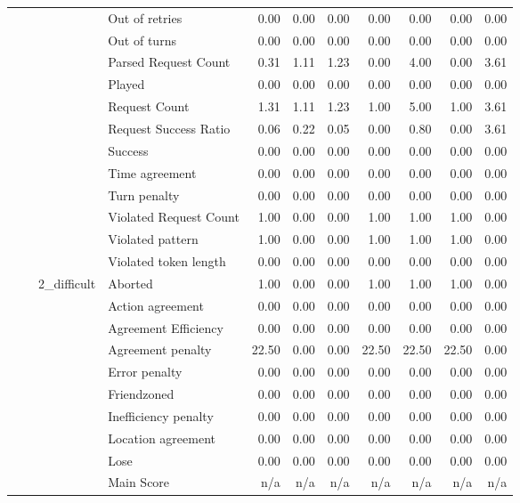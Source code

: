 \begin{tabular}{llllrrrrrrr}
 &  &  & Out of retries & 0.00 & 0.00 & 0.00 & 0.00 & 0.00 & 0.00 & 0.00 \\
 &  &  & Out of turns & 0.00 & 0.00 & 0.00 & 0.00 & 0.00 & 0.00 & 0.00 \\
 &  &  & Parsed Request Count & 0.31 & 1.11 & 1.23 & 0.00 & 4.00 & 0.00 & 3.61 \\
 &  &  & Played & 0.00 & 0.00 & 0.00 & 0.00 & 0.00 & 0.00 & 0.00 \\
 &  &  & Request Count & 1.31 & 1.11 & 1.23 & 1.00 & 5.00 & 1.00 & 3.61 \\
 &  &  & Request Success Ratio & 0.06 & 0.22 & 0.05 & 0.00 & 0.80 & 0.00 & 3.61 \\
 &  &  & Success & 0.00 & 0.00 & 0.00 & 0.00 & 0.00 & 0.00 & 0.00 \\
 &  &  & Time agreement & 0.00 & 0.00 & 0.00 & 0.00 & 0.00 & 0.00 & 0.00 \\
 &  &  & Turn penalty & 0.00 & 0.00 & 0.00 & 0.00 & 0.00 & 0.00 & 0.00 \\
 &  &  & Violated Request Count & 1.00 & 0.00 & 0.00 & 1.00 & 1.00 & 1.00 & 0.00 \\
 &  &  & Violated pattern & 1.00 & 0.00 & 0.00 & 1.00 & 1.00 & 1.00 & 0.00 \\
 &  &  & Violated token length & 0.00 & 0.00 & 0.00 & 0.00 & 0.00 & 0.00 & 0.00 \\
\cline{3-11}
 &  & \multirow[t]{27}{*}{2_difficult} & Aborted & 1.00 & 0.00 & 0.00 & 1.00 & 1.00 & 1.00 & 0.00 \\
 &  &  & Action agreement & 0.00 & 0.00 & 0.00 & 0.00 & 0.00 & 0.00 & 0.00 \\
 &  &  & Agreement Efficiency & 0.00 & 0.00 & 0.00 & 0.00 & 0.00 & 0.00 & 0.00 \\
 &  &  & Agreement penalty & 22.50 & 0.00 & 0.00 & 22.50 & 22.50 & 22.50 & 0.00 \\
 &  &  & Error penalty & 0.00 & 0.00 & 0.00 & 0.00 & 0.00 & 0.00 & 0.00 \\
 &  &  & Friendzoned & 0.00 & 0.00 & 0.00 & 0.00 & 0.00 & 0.00 & 0.00 \\
 &  &  & Inefficiency penalty & 0.00 & 0.00 & 0.00 & 0.00 & 0.00 & 0.00 & 0.00 \\
 &  &  & Location agreement & 0.00 & 0.00 & 0.00 & 0.00 & 0.00 & 0.00 & 0.00 \\
 &  &  & Lose & 0.00 & 0.00 & 0.00 & 0.00 & 0.00 & 0.00 & 0.00 \\
 &  &  & Main Score & n/a & n/a & n/a & n/a & n/a & n/a & n/a \\

\end{tabular}
